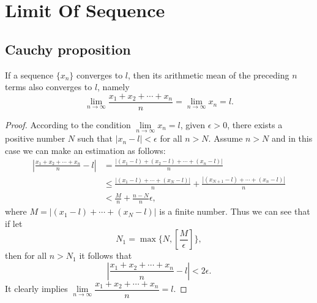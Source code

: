 \documentclass[11pt,fleqn]{book} %
\begin{document}
\chapter{Limit Of Sequence}

\section{Cauchy proposition}

\begin{theorem}
    If a sequence $\{x_n\}$ converges to $l$, then its arithmetic mean of the preceding $n$ terms also converges to $l$, namely
    \begin{equation}
    \lim\limits_{n\to\infty}\frac{x_1+x_2+\cdots+x_n}{n}=\lim\limits_{n\to\infty}x_n=l.
    \end{equation}
\end{theorem}

\begin{proof}
	According to the condition $\lim\limits_{n\to\infty}x_n=l$, given $\epsilon>0$, there exists a positive number $N$ such that $|x_n-l|<\epsilon$ for all $n>N$. Assume $n>N$ and in this case we can make an estimation as follows:
	\begin{align*}
	\left|\frac{x_1+x_2+\cdots+x_n}{n}-l\right|
	&=\frac{\left|(x_1-l)+(x_2-l)+\cdots+(x_n-l)\right|}{n}\\
	&\leqslant\frac{\left|(x_1-l)+\cdots+(x_N-l)\right|}{n}+\frac{\left|(x_{N+1}-l)+\cdots+(x_n-l)\right|}{n}\\
	&<\frac{M}{n}+\frac{n-N}{n}\epsilon,
	\end{align*}
    where $M=\left|(x_1-l)+\cdots+(x_N-l)\right|$ is a finite number. Thus we can see that if let
	\[
	N_1=\max\{N,\left[\frac{M}{\epsilon}\right]\},
	\]
	then for all $n>N_1$ it follows that
	\[
		\left|\frac{x_1+x_2+\cdots+x_n}{n}-l\right|<2\epsilon.
	\]
	It clearly implies $
	\lim\limits_{n\to\infty}\dfrac{x_1+x_2+\cdots+x_n}{n}=l.
$

\end{proof}
\end{document}
